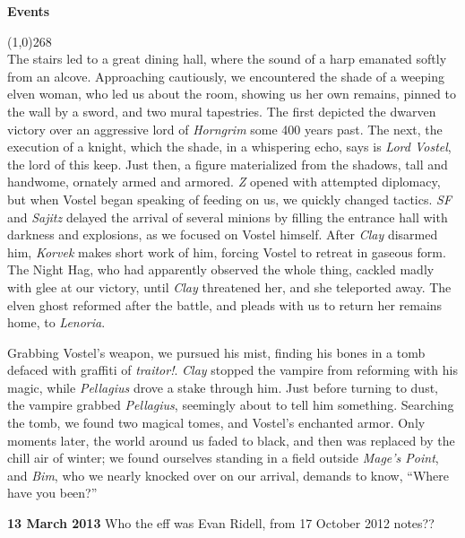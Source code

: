 \documentclass[letterpaper]{article}
\newcommand{\colline}{\line(1,0){268} \\}
\newcommand{\e}[1]{\emph{#1}}
\newcommand{\B}[1]{\textbf{#1}}
\newenvironment{notesection}[1]
{ {\huge \B{#1}} \par
\vspace{-0.75em}
\colline
\begingroup\fontsize{9pt}{12pt}\selectfont}
{\endgroup}
\begin{document}
\begin{notesection}{Events}
The stairs led to a great dining hall, where the sound of a harp emanated softly from an alcove.  Approaching cautiously, we encountered the shade of a weeping elven woman, who led us about the room, showing us her own remains, pinned to the wall by a sword, and two mural tapestries.  The first depicted the dwarven victory over an aggressive lord of \e{Horngrim} some 400 years past.  The next, the execution of a knight, which the shade, in a whispering echo, says is \e{Lord Vostel}, the lord of this keep.  Just then, a figure materialized from the shadows, tall and handwome, ornately armed and armored.  \e{Z} opened with attempted diplomacy, but when Vostel began speaking of feeding on us, we quickly changed tactics.  \e{SF} and \e{Sajitz} delayed the arrival of several minions by filling the entrance hall with darkness and explosions, as we focused on Vostel himself.  After \e{Clay} disarmed him, \e{Korvek} makes short work of him, forcing Vostel to retreat in gaseous form. The Night Hag, who had apparently observed the whole thing, cackled madly with glee at our victory, until \e{Clay} threatened her, and she teleported away. The elven ghost reformed after the battle, and pleads with us to return her remains home, to \e{Lenoria}.

Grabbing Vostel's weapon, we pursued his mist, finding his bones in a tomb defaced with graffiti of \e{traitor!}.  \e{Clay} stopped the vampire from reforming with his magic, while \e{Pellagius} drove a stake through him.  Just before turning to dust, the vampire grabbed \e{Pellagius}, seemingly about to tell him something.  Searching the tomb, we found two magical tomes, and Vostel's enchanted armor. Only moments later, the world around us faded to black, and then was replaced by the chill air of winter; we found ourselves standing in a field outside \e{Mage's Point}, and \e{Bim}, who we nearly knocked over on our arrival, demands to know, ``Where have you been?''

\B{13 March 2013}
Who the eff was Evan Ridell, from 17 October 2012 notes??
\end{notesection}
\end{document}
